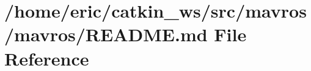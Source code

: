 \hypertarget{mavros_2mavros_2README_8md}{}\section{/home/eric/catkin\+\_\+ws/src/mavros/mavros/\+R\+E\+A\+D\+ME.md File Reference}
\label{mavros_2mavros_2README_8md}

